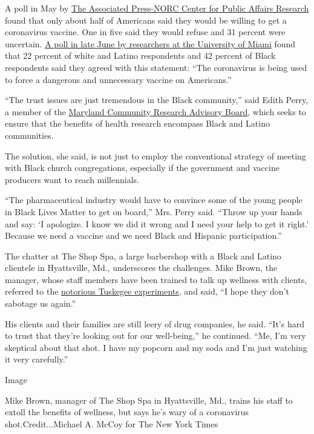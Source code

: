 A poll in May by
\href{https://apnews.com/dacdc8bc428dd4df6511bfa259cfec44}{The
Associated Press-NORC Center for Public Affairs Research} found that
only about half of Americans said they would be willing to get a
coronavirus vaccine. One in five said they would refuse and 31 percent
were uncertain.
\href{https://www.newsweek.com/will-black-americans-fear-vaccine-more-covid-19-opinion-1516087}{A
poll in late June by researchers at the University of Miami} found that
22 percent of white and Latino respondents and 42 percent of Black
respondents said they agreed with this statement: ``The coronavirus is
being used to force a dangerous and unnecessary vaccine on Americans.''

``The trust issues are just tremendous in the Black community,'' said
Edith Perry, a member of the
\href{https://sph.umd.edu/center/che/maryland-community-research-advisory-board-md-crab}{Maryland
Community Research Advisory Board}, which seeks to ensure that the
benefits of health research encompass Black and Latino communities.

The solution, she said, is not just to employ the conventional strategy
of meeting with Black church congregations, especially if the government
and vaccine producers want to reach millennials.

``The pharmaceutical industry would have to convince some of the young
people in Black Lives Matter to get on board,'' Mrs. Perry said. ``Throw
up your hands and say: `I apologize. I know we did it wrong and I need
your help to get it right.' Because we need a vaccine and we need Black
and Hispanic participation.''

The chatter at The Shop Spa, a large barbershop with a Black and Latino
clientele in Hyattsville, Md., underscores the challenges. Mike Brown,
the manager, whose staff members have been trained to talk up wellness
with clients, referred to the
\href{https://www.nytimes3xbfgragh.onion/1997/05/12/us/families-emerge-as-silent-victims-of-tuskegee-syphilis-experiment.html}{notorious
Tuskegee experiments}, and said, ``I hope they don't sabotage us
again.''

His clients and their families are still leery of drug companies, he
said. ``It's hard to trust that they're looking out for our
well-being,'' he continued. ``Me, I'm very skeptical about that shot. I
have my popcorn and my soda and I'm just watching it very carefully.''

Image

Mike Brown, manager of The Shop Spa in Hyattsville, Md., trains his
staff to extoll the benefits of wellness, but says he's wary of a
coronavirus shot.Credit...Michael A. McCoy for The New York Times

